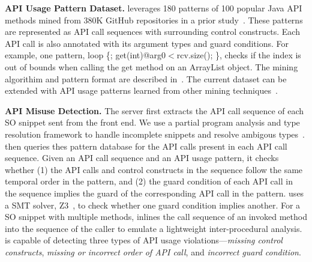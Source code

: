 \begin{table*}[!th]
{\begin{tabular}{|l|l|l|}
\end{tabular}
}
\caption{Description templates for different types of API usage violations. {\textless?\textgreater} and {\textless before/after\textgreater} are instantiated based on API usage violations and correct patterns. The digits in the last column are the Stack Overflow post ids where each example warning message is reported.}
\label{tab:template}
\end{table*}

{\bf API Usage Pattern Dataset.} {\tool} leverages 180 patterns of 100 popular Java API methods mined from 380K GitHub repositories in a prior study~\cite{zhang2018code}. These patterns are represented as API call sequences with surrounding control constructs. Each API call is also annotated with its argument types and guard conditions. For example, one pattern, {\ttt loop \{; get(int)@arg0$<$rcv.size(); \}}, checks if the index is out of bounds when calling the {\ttt get} method on an {\ttt ArrayList} object. The mining algorithim and pattern format are described in~\cite{zhang2018code}. The current dataset can be extended with API usage patterns learned from other mining techniques~\cite{gruska2010learning, wang2013mining, zhong2009mapo, Nguyen09}. 

{\bf API Misuse Detection.} The server first extracts the API call sequence of each SO snippet sent from the front end. We use a partial program analysis and type resolution framework to handle incomplete snippets and resolve ambigous types~\cite{subramanian2014live}. {\tool} then queries thes pattern database for the API calls present in each API call sequence. Given an API call sequence and an API usage pattern, it checks whether (1) the API calls and control constructs in the sequence follow the same temporal order in the pattern, and (2) the guard condition of each API call in the sequence implies the guard of the corresponding API call in the pattern. {\tool} uses a SMT solver, Z3~\cite{de2008z3}, to check whether one guard condition implies another. For a SO snippet with multiple methods, {\tool} inlines the call sequence of an invoked method into the sequence of the caller to emulate a lightweight inter-procedural analysis. {\tool} is capable of detecting three types of API usage violations---{\em missing control constructs}, {\em missing or incorrect order of API call}, and {\em incorrect guard condition}.


